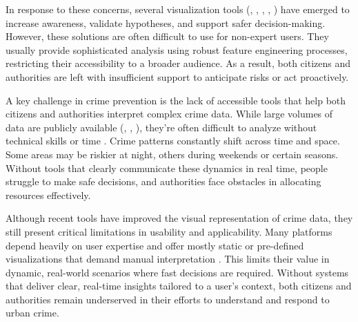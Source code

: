 In response to these concerns, several visualization tools (\cite{Garcia2022CriPAV}, \cite{Salah2022BigCDVis}, \cite{Silva2017CrimeVisAI}, \cite{Garcia2020MiranteAV}, \cite{Garcia2021CrimAnalyzer}) have emerged to increase awareness, validate hypotheses, and support safer decision-making. However, these solutions are often difficult to use for non-expert users. They usually provide sophisticated analysis using robust feature engineering processes, restricting their accessibility to a broader audience. As a result, both citizens and authorities are left with insufficient support to anticipate risks or act proactively.

A key challenge in crime prevention is the lack of accessible tools that help both citizens and authorities interpret complex crime data. While large volumes of data are publicly available (\cite{Zhang2025CrimeDatasetChina}, \cite{NYCDataset}, \cite{ChicagoDataset}), they're often difficult to analyze without technical skills or time \cite{Zengli2020CrimePatterns}. Crime patterns constantly shift across time and space. Some areas may be riskier at night, others during weekends or certain seasons. Without tools that clearly communicate these dynamics in real time, people struggle to make safe decisions, and authorities face obstacles in allocating resources effectively.

Although recent tools have improved the visual representation of crime data, they still present critical limitations in usability and applicability. Many platforms depend heavily on user expertise and offer mostly static or pre-defined visualizations that demand manual interpretation \cite{Garcia2022CriPAV}. This limits their value in dynamic, real-world scenarios where fast decisions are required. Without systems that deliver clear, real-time insights tailored to a user's context, both citizens and authorities remain underserved in their efforts to understand and respond to urban crime.




